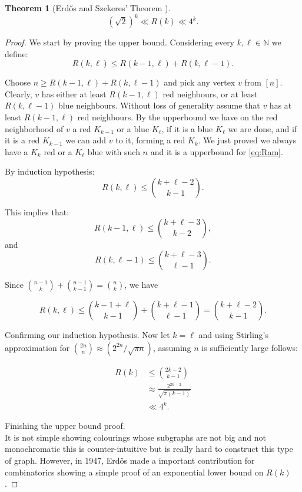 \documentclass[12pt,twoside,a4paper,bibliography=totocnumbered]{book}
\numberwithin{equation}{section}
\newtheorem{theorem}             {Theorem}[section]
\theoremstyle{remark}
\begin{document}
\begin{theorem}[{Erd\H{o}s and Szekeres' Theorem \cite{ersz35, Er47}}]\label{thm:ErdosandS}
$$(\sqrt{2})^k \ll R(k) \ll 4^k.$$
\end{theorem}
\begin{proof} We start by proving the upper bound. Considering every $k, \ell \in \mathbb{N}$ we define:\\
\begin{equation}\label{eq:Ram}
R(k,\ell ) \leq R(k-1,\ell )+R(k,\ell-1).
\end{equation}

Choose $n \geq R(k-1,\ell) + R(k, \ell-1)$ and pick any vertex $v$ from $[n]$. Clearly, $v$ has either at least $R(k-1,\ell)$ red neighbours, or at least $R(k,\ell-1)$ blue neighbours. Without loss of generality assume that $v$ has at least $R(k-1,\ell)$ red neighbours. By the upperbound we have on the red neighborhood of $v$ a red $K_{k-1}$ or a blue $K_{\ell}$, if it is a blue $K_{\ell}$ we are done, and if it is a red $K_{k-1}$ we can add $v$ to it, forming a red $K_k$. We just proved we always have a $K_k$ red or a $K_{\ell}$ blue with such $n$ and it is a upperbound for \ref{eq:Ram}.

By induction hypothesis:
$$R(k,\ell) \leq \binom{k+\ell - 2}{k - 1}.$$

This implies that:
$$R(k-1,\ell)\leq \binom{k+\ell -3}{k-2},$$ and $$R(k,\ell-1)\leq \binom{k+\ell-3}{\ell-1}.$$

Since $\binom{n-1}{k} + \binom{n-1}{k-1} = \binom{n}{k}$, we have

$$R(k,\ell)\leq \binom{k-1+\ell}{k-1} + \binom{k+\ell-1}{\ell-1} = \binom{k+ \ell -2}{k-1}.$$

Confirming our induction hypothesis. Now let $k = \ell$ and using Stirling's approximation for $\binom{2n}{n} \approx (2^{2n}/\sqrt{\pi n})$, assuming $n$ is sufficiently large follows:

\begin{align*}
R(k) &\leq \binom{2k -2}{k-1}\\
& \approx \frac{2^{2k-2}}{\sqrt{\pi (k-1)}}\\
& \ll 4^k.
\end{align*}

Finishing the upper bound proof.\\

It is not simple showing colourings whose subgraphs are not big and not monochromatic this is counter-intuitive but is really hard to construct this type of graph. However, in 1947, Erd\H{o}s made a important contribution for combinatorics showing a simple proof of an exponential lower bound on $R(k)$.


\end{proof}
\end{document}
